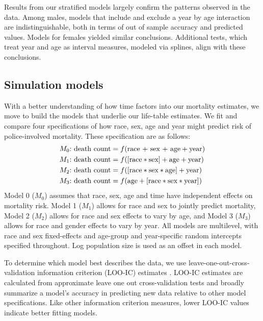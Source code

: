 \documentclass{article}
\begin{document}
Results from our stratified models largely confirm the patterns observed in the data. Among males, models that include and exclude a year by age interaction are indistinguishable, both in terms of out of sample accuracy and predicted values. Models for females yielded similar conclusions. Additional tests, which treat year and age as interval measures, modeled via splines, align with these conclusions.  

\subsection*{Simulation models}  

With a better understanding of how time factors into our mortality estimates, we move to build the models that underlie our life-table estimates. We fit and compare four specifications of how race, sex, age and year might predict risk of police-involved mortality. These specification are as follows: 
	\begin{align*}
		M_0\text{:} & \text{ death count} = f(\text{\text{race} + \text{sex} + age} + \text{year}) \\
		M_1\text{:} & \text{ death count} = f([\text{race}*\text{sex}] + \text{age} + \text{year}) \\
    M_2\text{:} & \text{ death count} = f([\text{race}*\text{sex}*\text{age}] + \text{year})   \\
		M_3\text{:} & \text{ death count} = f(\text{age} + [\text{race}*\text{sex}*\text{year}])   
	\end{align*}
Model 0 ($M_0$) assumes that race, sex, age and time have independent effects on mortality risk. Model 1 ($M_1$) allows for race and sex to jointly predict mortality, Model 2 ($M_2$) allows for race and sex effects to vary by age, and Model 3 ($M_3$) allows for race and gender effects to vary by year. All models are multilevel, with race and sex fixed-effects and age-group and year-specific random intercepts specified throughout. Log population size is used as an offset in each model.  

To determine which model best describes the data, we use leave-one-out-cross-validation information criterion (LOO-IC) estimates \cite{vehtari2016bayesian}. LOO-IC estimates are calculated from approximate leave one out cross-validation tests and broadly summarize a model's accuracy in predicting new data relative to other model specifications. Like other information criterion measures, lower LOO-IC values indicate better fitting models. 
\end{document}
